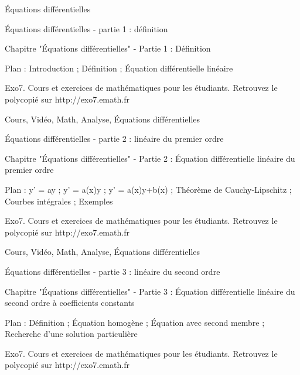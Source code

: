 
   Équations différentielles




Équations différentielles - partie 1 : définition


\video{}

Chapitre "Équations différentielles" - Partie 1 : Définition

Plan : Introduction ; Définition ; Équation différentielle linéaire

Exo7. Cours et exercices de mathématiques pour les étudiants.
Retrouvez le polycopié sur http://exo7.emath.fr


Cours, Vidéo, Math, Analyse, Équations différentielles



Équations différentielles - partie 2 : linéaire du premier ordre


\video{}

Chapitre "Équations différentielles" - Partie 2 : Équation différentielle linéaire du premier ordre

Plan : y' = ay ; y' = a(x)y ; y' = a(x)y+b(x) ; Théorème de Cauchy-Lipschitz ;
Courbes intégrales ; Exemples

Exo7. Cours et exercices de mathématiques pour les étudiants.
Retrouvez le polycopié sur http://exo7.emath.fr


Cours, Vidéo, Math, Analyse, Équations différentielles



Équations différentielles - partie 3 : linéaire du second ordre


\video{}

Chapitre "Équations différentielles" - Partie 3 : Équation différentielle linéaire du second ordre à coefficients constants

Plan : Définition ; Équation homogène ; Équation avec second membre ;
Recherche d'une solution particulière

Exo7. Cours et exercices de mathématiques pour les étudiants.
Retrouvez le polycopié sur http://exo7.emath.fr

